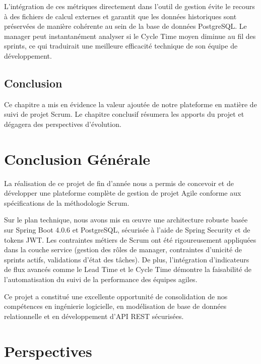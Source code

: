 \documentclass[12pt,a4paper]{report}
\begin{document}
L'intégration de ces métriques directement dans l'outil de gestion évite le recours à des fichiers de calcul externes et garantit que les données historiques sont préservées de manière cohérente au sein de la base de données PostgreSQL. Le manager peut instantanément analyser si le Cycle Time moyen diminue au fil des sprints, ce qui traduirait une meilleure efficacité technique de son équipe de développement.

\section{Conclusion}

Ce chapitre a mis en évidence la valeur ajoutée de notre plateforme en matière de suivi de projet Scrum. Le chapitre conclusif résumera les apports du projet et dégagera des perspectives d'évolution.


\chapter*{Conclusion Générale}

La réalisation de ce projet de fin d'année nous a permis de concevoir et de développer une plateforme complète de gestion de projet Agile conforme aux spécifications de la méthodologie Scrum.

Sur le plan technique, nous avons mis en œuvre une architecture robuste basée sur Spring Boot 4.0.6 et PostgreSQL, sécurisée à l'aide de Spring Security et de tokens JWT. Les contraintes métiers de Scrum ont été rigoureusement appliquées dans la couche service (gestion des rôles de manager, contraintes d'unicité de sprints actifs, validations d'état des tâches). De plus, l'intégration d'indicateurs de flux avancés comme le Lead Time et le Cycle Time démontre la faisabilité de l'automatisation du suivi de la performance des équipes agiles.

Ce projet a constitué une excellente opportunité de consolidation de nos compétences en ingénierie logicielle, en modélisation de base de données relationnelle et en développement d'API REST sécurisées.


\chapter*{Perspectives}
\end{document}
